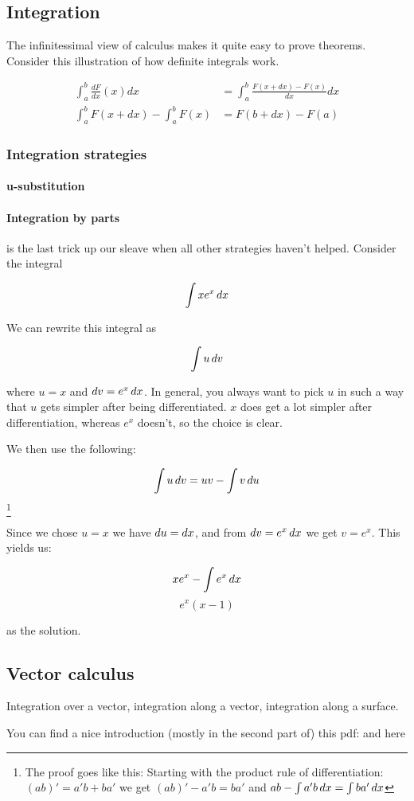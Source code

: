 \subsection{Integration}

The infinitessimal view of calculus makes it quite easy to prove theorems. Consider this illustration of how definite integrals work.

\begin{equation}
    \begin{aligned}
        \int_a^b \frac{dF}{dx}(x) dx &= \int_a^b \frac{F(x + dx) - F(x)}{dx} dx \\
        \int_a^b F(x + dx) - \int_a^b F(x) &= F(b + dx) - F(a)
    \end{aligned}
\end{equation}


\subsubsection{Integration strategies}

\paragraph{u-substitution}

\paragraph{Integration by parts} is the last trick up our sleave when all other strategies haven't helped. Consider the integral 

$$ \int x e^x \mathop{dx} $$

We can rewrite this integral as 

$$ \int u \mathop{dv} $$

where $u = x$ and $\mathop{dv} = e^x \mathop{dx}$. In general, you always want to pick $u$ in such a way that $u$ gets simpler after being differentiated.
$x$ does get a lot simpler after differentiation, whereas $e^x$ doesn't, so the choice is clear. 

We then use the following: 

$$ \int u \mathop{dv} = uv - \int v \mathop{du} $$\footnote{The proof goes like this: Starting with the product rule of differentiation: $(ab)' = a'b + ba'$ we get $(ab)' - a'b = ba'$ and  $ab - \int a'b \mathop{dx} = \int ba' \mathop{dx} $}

Since we chose $u = x$ we have $\mathop{du} = \mathop{dx}$, and from $\mathop{dv} = e^x \mathop{dx}$ we get $v = e^x$. This yields us: 

$$ xe^x - \int e^x \mathop{dx} $$
$$ e^x ( x - 1) $$

as the solution. 

\subsection{Vector calculus}

Integration over a vector, integration along a vector, integration along a surface. 

You can find a nice introduction (mostly in the second part of) this pdf:  and here 
